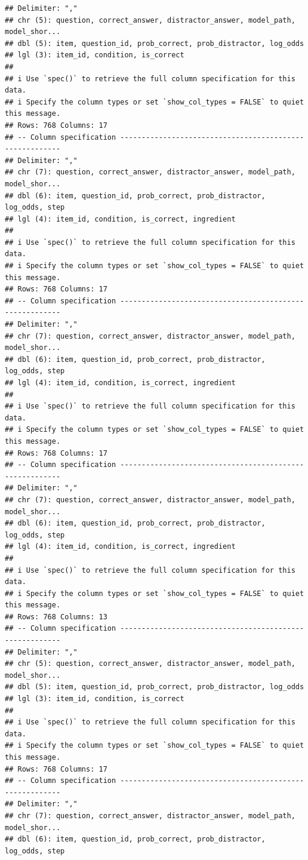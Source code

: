 \documentclass[
]{article}
\begin{document}
\begin{verbatim}
## Delimiter: ","
## chr (5): question, correct_answer, distractor_answer, model_path, model_shor...
## dbl (5): item, question_id, prob_correct, prob_distractor, log_odds
## lgl (3): item_id, condition, is_correct
## 
## i Use `spec()` to retrieve the full column specification for this data.
## i Specify the column types or set `show_col_types = FALSE` to quiet this message.
## Rows: 768 Columns: 17
## -- Column specification --------------------------------------------------------
## Delimiter: ","
## chr (7): question, correct_answer, distractor_answer, model_path, model_shor...
## dbl (6): item, question_id, prob_correct, prob_distractor, log_odds, step
## lgl (4): item_id, condition, is_correct, ingredient
## 
## i Use `spec()` to retrieve the full column specification for this data.
## i Specify the column types or set `show_col_types = FALSE` to quiet this message.
## Rows: 768 Columns: 17
## -- Column specification --------------------------------------------------------
## Delimiter: ","
## chr (7): question, correct_answer, distractor_answer, model_path, model_shor...
## dbl (6): item, question_id, prob_correct, prob_distractor, log_odds, step
## lgl (4): item_id, condition, is_correct, ingredient
## 
## i Use `spec()` to retrieve the full column specification for this data.
## i Specify the column types or set `show_col_types = FALSE` to quiet this message.
## Rows: 768 Columns: 17
## -- Column specification --------------------------------------------------------
## Delimiter: ","
## chr (7): question, correct_answer, distractor_answer, model_path, model_shor...
## dbl (6): item, question_id, prob_correct, prob_distractor, log_odds, step
## lgl (4): item_id, condition, is_correct, ingredient
## 
## i Use `spec()` to retrieve the full column specification for this data.
## i Specify the column types or set `show_col_types = FALSE` to quiet this message.
## Rows: 768 Columns: 13
## -- Column specification --------------------------------------------------------
## Delimiter: ","
## chr (5): question, correct_answer, distractor_answer, model_path, model_shor...
## dbl (5): item, question_id, prob_correct, prob_distractor, log_odds
## lgl (3): item_id, condition, is_correct
## 
## i Use `spec()` to retrieve the full column specification for this data.
## i Specify the column types or set `show_col_types = FALSE` to quiet this message.
## Rows: 768 Columns: 17
## -- Column specification --------------------------------------------------------
## Delimiter: ","
## chr (7): question, correct_answer, distractor_answer, model_path, model_shor...
## dbl (6): item, question_id, prob_correct, prob_distractor, log_odds, step

\end{verbatim}
\end{document}
